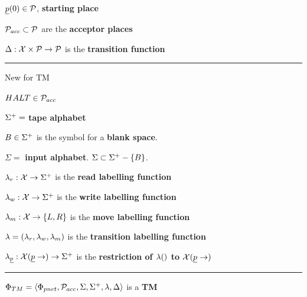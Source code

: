 $\rvp(0)\in \calp$, {\bf starting place }

${\cal P}_{acc}\subset {\cal P}$ are the 
{\bf acceptor places}

$\Delta:{\cal X}\times{\cal P}\rightarrow {\cal P}$ is the 
{\bf transition function}
\hrule
New for TM

$HALT\in {\cal P}_{acc}$

$\Sigma^+ =$ {\bf tape alphabet}

$B\in \Sigma^+$ is the  symbol for a {\bf blank space}.

$\Sigma=$ {\bf input alphabet}. $\Sigma\subset\Sigma^+-\{B\}$. 

$\lambda_{r}:{\cal X}\rightarrow \Sigma^+$ is the {\bf read  labelling function}

$\lambda_{w}:{\cal X}\rightarrow \Sigma^+$ is the {\bf write  labelling function}

$\lambda_{m}:{\cal X}\rightarrow \{L,R\}$ is the {\bf move 
labelling function}

$\lambda = (\lambda_r, \lambda_w, \lambda_m)$ is the
{\bf transition labelling function}

$\lam_\rvp: \calx(\rvp\rarrow)\rarrow \TA$ is the
{\bf restriction of $\lambda()$ to $\calx(\rvp\rarrow)$}

\hrule
$\Phi_{TM}=\left\langle\Phi_{pnet},{\cal P}_{acc}, \Sigma,
\Sigma^+, \lambda, \Delta\right\rangle$  is a {\bf TM}



